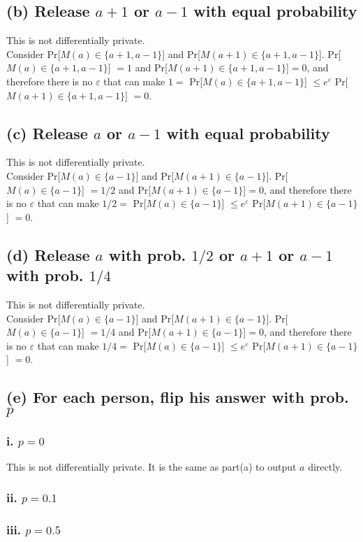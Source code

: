 \documentclass{article}
\begin{document}
\subsection*{(b) Release $a+1$ or $a-1$ with equal probability}
This is not differentially private. \\
Consider Pr[$M(a)\in \{a+1, a-1\}$] and Pr[$M(a+1)\in \{a+1, a-1\}$]. Pr[$M(a)\in \{a+1, a-1\}$] $= 1$ and Pr[$M(a+1)\in \{a+1, a-1\}$]$= 0$, and therefore there is no $\varepsilon$ that can make $1=$ Pr[$M(a)\in \{a+1, a-1\}$] $ \leq e^{\varepsilon}$ Pr[$M(a+1)\in \{a+1, a-1\}$] $= 0$.

\subsection*{(c) Release $a$ or $a-1$ with equal probability}
This is not differentially private. \\
Consider Pr[$M(a)\in \{a-1\}$] and Pr[$M(a+1)\in \{a-1\}$]. Pr[$M(a)\in \{a-1\}$] $= 1/2$ and Pr[$M(a+1)\in \{a-1\}$]$= 0$, and therefore there is no $\varepsilon$ that can make $1/2=$ Pr[$M(a)\in \{a-1\}$] $ \leq e^{\varepsilon}$ Pr[$M(a+1)\in \{a-1\}$] $= 0$.

\subsection*{(d) Release $a$ with prob. $1/2$ or $a+1$ or $a-1$ with prob. $1/4$}
This is not differentially private. \\
Consider Pr[$M(a)\in \{a-1\}$] and Pr[$M(a+1)\in \{a-1\}$]. Pr[$M(a)\in \{a-1\}$] $= 1/4$ and Pr[$M(a+1)\in \{a-1\}$]$= 0$, and therefore there is no $\varepsilon$ that can make $1/4=$ Pr[$M(a)\in \{a-1\}$] $ \leq e^{\varepsilon}$ Pr[$M(a+1)\in \{a-1\}$] $= 0$.

\subsection*{(e) For each person, flip his answer with prob. $p$}
\subsubsection*{i. $p=0$}
This is not differentially private. It is the same as part(a) to output $a$ directly.
\subsubsection*{ii. $p=0.1$}

\subsubsection*{iii. $p=0.5$}
\end{document}
